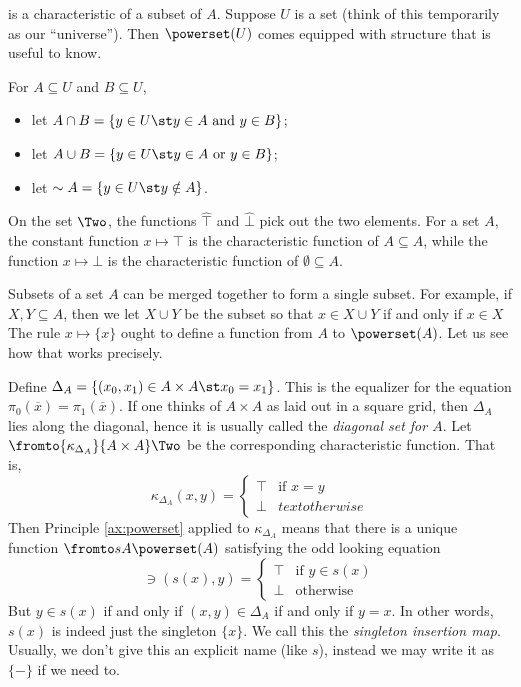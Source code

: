 is a characteristic of a subset of $A$. 
Suppose $U$ is a set (think of this temporarily as our ``universe''). 
Then $\powerset(U)$ comes equipped with structure that is useful to know.

\begin{defn}
For $A\subseteq U$ and $B\subseteq U$, 
 \begin{itemize}
 	\item let $A\cap B = \{y\in U\st \text{$y\in A$  and $y\in B$}\}$;
 	\item let $A\cup B = \{y\in U \st \text{$y\in A$ or $y\in B$}\}$;
 	\item let $\sim A = \{y\in U\st y\notin A\}$.
 \end{itemize}
\end{defn}



On the set $\Two$, the functions $\hat{\top}$ and $\hat{\bot}$
pick out the two elements. For a set $A$, the constant function $x\mapsto \top$
is the characteristic function of $A\subseteq A$, while the function $x\mapsto \bot$ is the characteristic function of $\emptyset\subseteq A$. 

Subsets of a set $A$ can be merged together to form a single subset. 
For example, if $X,Y\subseteq A$, then we let $X\cup Y$ be the subset
so that $x\in X\cup Y$ if and only if $x\in X$ 
The rule $x\mapsto \{x\}$ ought to define a function from $A$ to $\powerset(A)$. Let us see how that works precisely.

Define $\Delta_A = \{(x_0,x_1)\in A\times A\st x_0=x_1\}$. This is the equalizer for the equation $\pi_0(\overline x)=\pi_1(\overline x)$.
If one thinks of $A\times A$ as laid out in a square grid, then $\Delta_A$ lies along the diagonal, hence it is usually called the \emph{diagonal set for $A$}.
Let $\fromto {\kappa_{\Delta_A}}{A\times A}\Two$ be the corresponding characteristic function. That is,
\[
\kappa_{\Delta_A}(x,y) = \begin{cases}
\top & \text{if $x=y$}\\
\bot & text{otherwise}
\end{cases}
\]
Then Principle \ref{ax:powerset} applied to $\kappa_{\Delta_A}$ means that there is a unique function $\fromto sA{\powerset(A)}$ satisfying the odd looking equation 
\[
\ni(s(x),y) = \begin{cases}
		\top & \text{if $y\in s(x)$}\\
		\bot &\text{otherwise}
	\end{cases}
\]
But $y\in s(x)$ if and only if $(x,y)\in\Delta_A$ if and only if $y=x$. 
In other words, $s(x)$ is indeed just the singleton $\{x\}$. We call this the \emph{singleton insertion map}. Usually, we don't give this an explicit name (like $s$), instead we may write it as $\{-\}$ if we need to.

